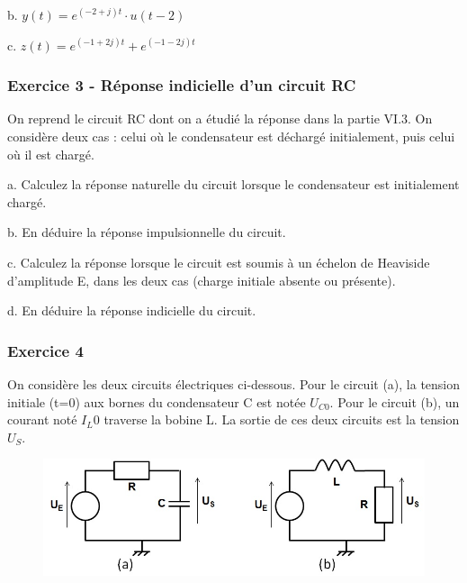 \documentclass[]{report}
\begin{document}
	b. $y(t) = e^{(-2+j)t}\cdot u(t-2)$ 
	
	c. $z(t) = e^{(-1+2j)t}+e^{(-1-2j)t}$
	
	\vspace{1\baselineskip} 
	
	
	\subsubsection{Exercice 3 - Réponse indicielle d'un circuit RC}
	
	On reprend le circuit RC dont on a étudié la réponse dans la partie VI.3. On considère deux cas : celui où le condensateur est déchargé initialement, puis celui où il est chargé. 
	
	a. Calculez la réponse naturelle du circuit lorsque le condensateur est initialement chargé.
	
	b. En déduire la réponse impulsionnelle du circuit.
	
	c. Calculez la réponse lorsque le circuit est soumis à un échelon de Heaviside d'amplitude E, dans les deux cas (charge initiale absente ou présente).
	
	d. En déduire la réponse indicielle du circuit.
	
	\vspace{1\baselineskip}	
	

	
	\subsubsection{Exercice 4}
	
	On considère les deux circuits électriques ci-dessous. Pour le circuit (a), la tension initiale (t=0) aux bornes du condensateur C est notée $U_{C0}$. Pour le circuit (b), un courant noté $I_L0$ traverse la bobine L. La sortie de ces deux circuits est la tension $U_{S}$.
	
	\begin{figure}[h!]
		\centering
		\includegraphics[scale=0.5]{images/Exo_2_4.jpg} 
	\end{figure} 
	
\end{document}
